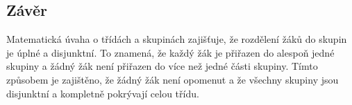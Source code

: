 \subsection*{Závěr}

Matematická úvaha o třídách a skupinách zajišťuje, že rozdělení žáků do skupin je úplné a disjunktní. To znamená, že každý žák je přiřazen do alespoň jedné skupiny a žádný žák není přiřazen do více než jedné části skupiny. Tímto způsobem je zajištěno, že žádný žák není opomenut a že všechny skupiny jsou disjunktní a kompletně pokrývají celou třídu.

